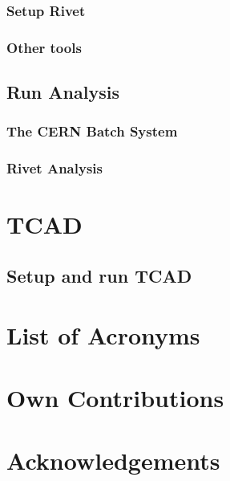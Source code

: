 \documentclass[twoside,11pt,a4paper]{book}
\begin{document}
		\subsection{Setup Rivet}
		
		\subsection{Other tools}
		
		
	\section{Run Analysis}
		\subsection{The CERN Batch System}
		
		\subsection{Rivet Analysis}
		
		
	
\clearpage

\chapter{TCAD}
	\label{chap:tcad}
	\section{Setup and run TCAD}
		



\clearpage
\listoffigures
{}

\newpage
\pagestyle{unfancy}
\chapter*{List of Acronyms}
\acresetall
\begin{acronym}
\end{acronym}

\newpage
\pagestyle{fancy}
%
%



\newpage
\pagestyle{unfancy}
\chapter*{Own Contributions}
%

\newpage
\chapter*{Acknowledgements}
%
\end{document}

